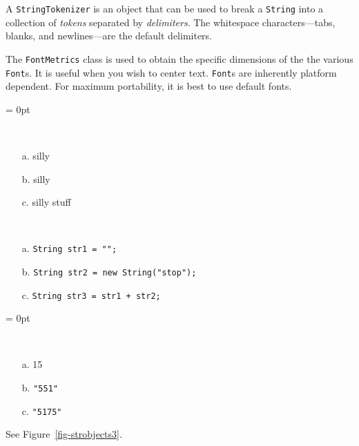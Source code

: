\begin{SMBL}
\item  A {\tt StringTokenizer} is an object that can be used to
break a {\tt String} into a collection of {\it tokens} separated by
{\it delimiters}. The whitespace characters---tabs, blanks, and
newlines---are the default delimiters.

\item  The {\tt FontMetrics} class is used to obtain the
specific dimensions of the the various {\tt Font}s.  It
is useful when you wish to center text.  {\tt Font}s are
inherently platform dependent.  For maximum portability,
it is best to use default fonts.

\end{SMBL}

\secANSH
\begin{ANS}
\columnsep = 0pt\begin{multicols}{4}
\item \mbox{ }
\begin{enumerate}
\item[a.]  silly       
\item[b.]  silly       
\item[c.]  silly stuff 
\end{enumerate}
\end{multicols}

\item  \mbox{ }
\begin{enumerate}
\item[a.]  \verb|String str1 = "";|              
\item[b.]  \verb|String str2 = new String("stop");|
\item[c.]  \verb|String str3 = str1 + str2;|
\end{enumerate}



\columnsep = 0pt\begin{multicols}{4}
\item \mbox{ }
\begin{enumerate}
\item[a.]  15        
\item[b.]  \verb|"551"|
\item[c.]  \verb|"5175"| 
\end{enumerate}
\end{multicols}

\item  See Figure~\ref{fig-strobjects3}.
\label{ans-strobjects2}



\end{ANS}
